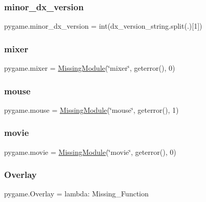 \subsubsection{\texorpdfstring{minor\+\_\+dx\+\_\+version}{minor\_dx\_version}}
{\footnotesize\ttfamily pygame.\+minor\+\_\+dx\+\_\+version = int(dx\+\_\+version\+\_\+string.\+split(\textquotesingle{}.\textquotesingle{})\mbox{[}1\mbox{]})}

\mbox{\label{namespacepygame_ab7515b51eb7665f5f7cc835e3f3525c1}} 
\subsubsection{\texorpdfstring{mixer}{mixer}}
{\footnotesize\ttfamily pygame.\+mixer = \hyperlink{classpygame_1_1_missing_module}{Missing\+Module}(\char`\"{}mixer\char`\"{}, geterror(), 0)}

\mbox{\label{namespacepygame_ab8b56478ee345a1d7fc1d3d864e449b8}} 
\subsubsection{\texorpdfstring{mouse}{mouse}}
{\footnotesize\ttfamily pygame.\+mouse = \hyperlink{classpygame_1_1_missing_module}{Missing\+Module}(\char`\"{}mouse\char`\"{}, geterror(), 1)}

\mbox{\label{namespacepygame_a5792f2ba5de6e56021afff5a88231ae4}} 
\subsubsection{\texorpdfstring{movie}{movie}}
{\footnotesize\ttfamily pygame.\+movie = \hyperlink{classpygame_1_1_missing_module}{Missing\+Module}(\char`\"{}movie\char`\"{}, geterror(), 0)}

\mbox{\label{namespacepygame_a39a58cb6111c08130fc73988c965865c}} 
\subsubsection{\texorpdfstring{Overlay}{Overlay}}
{\footnotesize\ttfamily pygame.\+Overlay = lambda\+: Missing\+\_\+\+Function}

